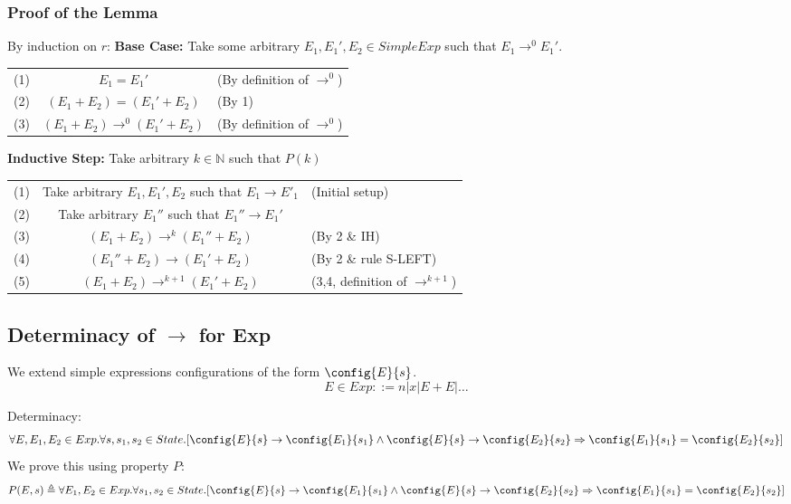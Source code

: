 \subsubsection*{Proof of the Lemma}
By induction on $r$:
\textbf{Base Case:}
Take some arbitrary $E_1, E_1', E_2 \in SimpleExp$ such that $E_1 \to^0 E_1'$.
\begin{center}
	\begin{tabular}{r c l}
		(1) & $E_1 = E_1'$                     & (By definition of $\to^0$) \\
		(2) & $(E_1 + E_2) = (E_1' + E_2)$     & (By 1)                     \\
		(3) & $(E_1 + E_2) \to^0 (E_1' + E_2)$ & (By definition of $\to^0$) \\
	\end{tabular}
\end{center}
\textbf{Inductive Step:}
Take arbitrary $k \in \mathbb{N}$ such that $P(k)$
\begin{center}
	\begin{tabular}{r c l}
		(1) & Take arbitrary $E_1, E_1', E_2$ such that $E_1 \to E'_1$ & (Initial setup)                  \\
		(2) & Take arbitrary $E_1''$ such that $E_1'' \to E_1'$        &                                  \\
		(3) & $(E_1 + E_2) \to^k (E_1'' + E_2)$                        & (By 2 \& IH)                     \\
		(4) & $(E_1'' + E_2) \to (E_1' + E_2)$                         & (By 2 \& rule S-LEFT)            \\
		(5) & $(E_1 + E_2) \to^{k+1} (E_1' + E_2)$                     & (3,4, definition of $\to^{k+1}$) \\
	\end{tabular}
\end{center}

\subsection{Determinacy of $\to$ for Exp}
We extend simple expressions configurations of the form $\config{E}{s}$.
\[E \in Exp ::= n | x | E + E | \dots\]

Determinacy:
\[\forall E,E_1,E_2 \in Exp . \forall s, s_1, s_2 \in State . [\config{E}{s} \to \config{E_1}{s_1} \land \config{E}{s} \to \config{E_2}{s_2} \Rightarrow \config{E_1}{s_1} = \config{E_2}{s_2}]\]
We prove this using property $P$:
\[P(E,s) \triangleq \forall E_1,E_2 \in Exp . \forall s_1, s_2 \in State . [\config{E}{s} \to \config{E_1}{s_1} \land \config{E}{s} \to \config{E_2}{s_2} \Rightarrow \config{E_1}{s_1} = \config{E_2}{s_2}]\]
